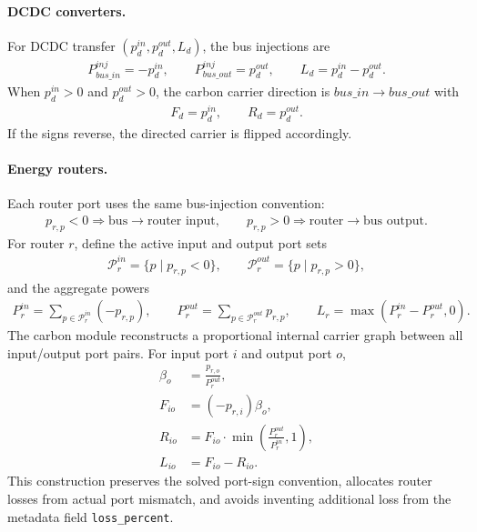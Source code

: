 \paragraph{DCDC converters.}
For DCDC transfer \((p^{in}_d, p^{out}_d, L_d)\), the bus injections are
\begin{align}
P^{inj}_{bus\_in} = -p^{in}_d,\qquad
P^{inj}_{bus\_out} = p^{out}_d,\qquad
L_d = p^{in}_d - p^{out}_d.
\end{align}
When \(p^{in}_d > 0\) and \(p^{out}_d > 0\), the carbon carrier direction is
\(bus\_in \rightarrow bus\_out\) with
\begin{align}
F_d = p^{in}_d,\qquad R_d = p^{out}_d.
\end{align}
If the signs reverse, the directed carrier is flipped accordingly.

\paragraph{Energy routers.}
Each router port uses the same bus-injection convention:
\begin{align}
p_{r,p} < 0 \Rightarrow \text{bus} \rightarrow \text{router input},\qquad
p_{r,p} > 0 \Rightarrow \text{router} \rightarrow \text{bus output}.
\end{align}
For router \(r\), define the active input and output port sets
\begin{align}
\mathcal{P}^{in}_r = \{p \mid p_{r,p} < 0\},\qquad
\mathcal{P}^{out}_r = \{p \mid p_{r,p} > 0\},
\end{align}
and the aggregate powers
\begin{align}
P_r^{in} = \sum_{p \in \mathcal{P}^{in}_r} (-p_{r,p}),\qquad
P_r^{out} = \sum_{p \in \mathcal{P}^{out}_r} p_{r,p},\qquad
L_r = \max(P_r^{in} - P_r^{out}, 0).
\end{align}
The carbon module reconstructs a proportional internal carrier graph between
all input/output port pairs.  For input port \(i\) and output port \(o\),
\begin{align}
\beta_o &= \frac{p_{r,o}}{P_r^{out}}, \\
F_{io} &= (-p_{r,i}) \beta_o, \\
R_{io} &= F_{io} \cdot \min\!\left(\frac{P_r^{out}}{P_r^{in}}, 1\right), \\
L_{io} &= F_{io} - R_{io}.
\end{align}
This construction preserves the solved port-sign convention, allocates router
losses from actual port mismatch, and avoids inventing additional loss from the
metadata field \texttt{loss\_percent}.

